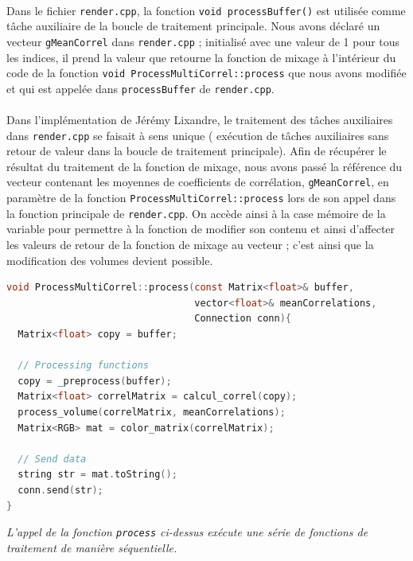  \paragraph{}
 Dans le fichier \verb!render.cpp!, la fonction
 \verb!void processBuffer()! est utilisée comme tâche auxiliaire de la
 boucle de traitement principale. Nous avons déclaré un vecteur
 \verb!gMeanCorrel! dans \verb!render.cpp! ; initialisé avec une valeur
 de 1 pour tous les indices, il prend la valeur que retourne la
 fonction de mixage à l'intérieur du code de la fonction
 \verb!void ProcessMultiCorrel::process!
 que nous avons modifiée et qui est appelée dans \verb!processBuffer!
 de \verb!render.cpp!.
 \paragraph{}
 Dans l'implémentation de Jérémy Lixandre, le traitement des tâches
 auxiliaires dans \verb!render.cpp! se faisait à sens unique (
 exécution de tâches auxiliaires sans retour de valeur dans la boucle
 de traitement principale). Afin de récupérer le résultat du
 traitement de la fonction de mixage, nous avons passé la référence du
 vecteur contenant les moyennes de coefficients de corrélation,
 \verb!gMeanCorrel!, en paramètre de la fonction
 \verb!ProcessMultiCorrel::process! lors de son appel dans la fonction
 principale de \verb!render.cpp!. On accède ainsi à la case mémoire de
 la variable pour permettre à la fonction de modifier son contenu et
 ainsi d'affecter les valeurs de retour de la fonction de mixage au
 vecteur ; c'est ainsi que la modification des volumes devient
 possible.

 \begin{lstlisting}[language=C, frame=single, breaklines=true]
void ProcessMultiCorrel::process(const Matrix<float>& buffer,
                                 vector<float>& meanCorrelations,
                                 Connection conn){
  Matrix<float> copy = buffer;

  // Processing functions
  copy = _preprocess(buffer);
  Matrix<float> correlMatrix = calcul_correl(copy);
  process_volume(correlMatrix, meanCorrelations);
  Matrix<RGB> mat = color_matrix(correlMatrix);

  // Send data
  string str = mat.toString();
  conn.send(str);
}
 \end{lstlisting}
 \begin{center}
  \textit{L'appel de la fonction \verb!process! ci-dessus exécute une série de fonctions de traitement de manière séquentielle.}
 \end{center}

